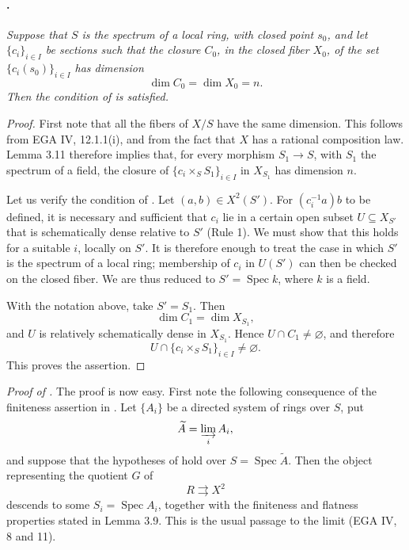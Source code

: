 \paragraph{.}
\textit{Suppose that \(S\) is the spectrum of a local ring, with
closed point \(s_0\), and let \(\{c_i\}_{i\in I}\) be sections
such that the closure \(C_0\), in the closed fiber \(X_0\), of
the set \(\{c_i(s_0)\}_{i\in I}\) has dimension
\[
  \dim C_0=\dim X_0=n.
\]
Then the condition of  is satisfied.}

\begin{proof}
First note that all the fibers of \(X/S\) have the same
dimension. This follows from EGA IV, 12.1.1(i), and from the fact
that \(X\) has a rational composition law. Lemma 3.11 therefore
implies that, for every morphism \(S_1\to S\), with \(S_1\) the
spectrum of a field, the closure of
\(\{c_i\times_S S_1\}_{i\in I}\) in \(X_{S_1}\) has dimension
\(n\).

Let us verify the condition of . Let
\((a,b)\in X^2(S')\). For \((c_i^{-1}a)b\) to be defined, it is
necessary and sufficient that \(c_i\) lie in a certain open
subset \(U\subseteq X_{S'}\) that is schematically dense relative
to \(S'\) (Rule 1). We must show that this holds for a suitable
\(i\), locally on \(S'\). It is therefore enough to treat the
case in which \(S'\) is the spectrum of a local ring; membership
of \(c_i\) in \(U(S')\) can then be checked on the closed fiber.
We are thus reduced to \(S'=\operatorname{Spec}k\), where \(k\)
is a field.

With the notation above, take \(S'=S_1\). Then
\[
  \dim C_1=\dim X_{S_1},
\]
and \(U\) is relatively schematically dense in \(X_{S_1}\).
Hence \(U\cap C_1\neq\varnothing\), and therefore
\[
  U\cap\{c_i\times_S S_1\}_{i\in I}\neq\varnothing.
\]
This proves the assertion.
\end{proof}

\noindent\textit{Proof of .}
The proof is now easy. First note the following consequence of
the finiteness assertion in . Let \(\{A_i\}\) be a
directed system of rings over \(S\), put
\[
  \widetilde A=\varinjlim_i A_i,
\]
and suppose that the hypotheses of  hold over
\(S=\operatorname{Spec}\widetilde A\). Then the object
representing the quotient \(G\) of
\[
  R\rightrightarrows X^2
\]
descends to some \(S_i=\operatorname{Spec}A_i\), together with
the finiteness and flatness properties stated in Lemma 3.9. This
is the usual passage to the limit (EGA IV, 8 and 11).

